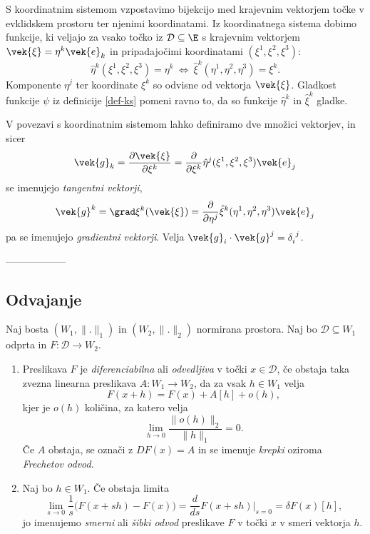 S koordinatnim sistemom vzpostavimo bijekcijo med krajevnim vektorjem točke v evklidskem prostoru ter
njenimi koordinatami. Iz koordinatnega sistema dobimo funkcije, ki veljajo za vsako
točko iz $\mathcal{D}\subseteq\E$ s krajevnim vektorjem $\vek{\xi}=\eta^k\vek{e}_k$ in pripadajočimi
koordinatami $(\xi^1,\xi^2,\xi^3)$:
\begin{equation*}
	\hat{\eta}^k(\xi^1,\xi^2,\xi^3) = \eta^k\ \Leftrightarrow\ \hat{\xi}^k(\eta^1,\eta^2,\eta^3) = \xi^k.
\end{equation*}
Komponente $\eta^j$ ter koordinate $\xi^k$ so odvisne od vektorja $\vek{\xi}$. Gladkost funkcije $\psi$
iz definicije \ref{def-ks} pomeni ravno to, da so funkcije $\hat{\eta}^k$ in $\hat{\xi}^k$ gladke.

V povezavi s koordinatnim sistemom lahko definiramo dve množici vektorjev, in sicer
\begin{equation*}
	\vek{g}_k = \frac{\partial\vek{\xi}}{\partial \xi^k} =
	\frac{\partial}{\partial \xi^k}\hat{\eta}^j(\xi^1,\xi^2,\xi^3)\vek{e}_j
\end{equation*}
se imenujejo \emph{tangentni vektorji},
\begin{equation*}
	\vek{g}^k = \grad \xi^k(\vek{\xi}) =
	\frac{\partial}{\partial \eta^j}\hat{\xi}^k(\eta^1,\eta^2,\eta^3)\vek{e}_j
\end{equation*}
pa se imenujejo \emph{gradientni vektorji}. Velja $\vek{g}_i\cdot\vek{g}^j=\delta_i^{\phantom{i}j}$.


------------------


\subsection{Odvajanje}

\begin{definicija}
	Naj bosta $(W_1,\| .\|_1)$ in $(W_2,\| .\|_2)$ normirana prostora. Naj bo $\mathcal{D}\subseteq W_1$
	odprta in $F:\mathcal{D}\rightarrow W_2$.
	\begin{enumerate}
		\item 
			Preslikava $F$ je \emph{diferenciabilna} ali \emph{odvedljiva} v točki $x\in\mathcal{D}$,
			če obstaja taka zvezna linearna preslikava $A:W_1\rightarrow W_2$, da za vsak $h\in W_1$ velja
			\begin{equation*}
				F(x+h)=F(x)+A[h]+o(h),
			\end{equation*}
			kjer je $o(h)$ količina, za katero velja
			\begin{equation*}
				\lim_{h\to 0}\frac{\| o(h)\|_2}{\| h\|_1}=0.
			\end{equation*}
			Če $A$ obstaja, se označi z $DF(x)=A$ in se imenuje \emph{krepki} oziroma \emph{Frechetov odvod}.
		\item
			Naj bo $h\in W_1$. Če obstaja limita
			\begin{equation*}
				\lim_{s\to 0}\frac{1}{s}\Big(F(x+sh)-F(x)\Big)=\frac{d}{ds}F(x+sh)\Big|_{s=0}=\delta F(x)[h],
			\end{equation*}
			jo imenujemo \emph{smerni} ali \emph{šibki odvod} preslikave $F$ v točki $x$ v smeri vektorja $h$.
	\end{enumerate}
\end{definicija}

